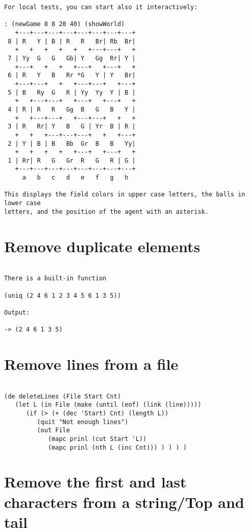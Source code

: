 \begin{verbatim}
For local tests, you can start also it interactively:

: (newGame 8 8 20 40) (showWorld)
   +---+---+---+---+---+---+---+---+
 8 | R   Y | B | R   R   Br| Rb  Br|
   +   +   +   +   +   +---+---+   +
 7 | Yy  G   G   Gb| Y   Gg  Rr| Y |
   +---+   +   +   +---+   +---+   +
 6 | R   Y   B   Rr *G   Y | Y   Br|
   +---+---+   +   +---+---+   +---+
 5 | B   Ry  G   R | Yy  Yy  Y | B |
   +   +---+---+   +---+   +---+   +
 4 | R | R   R   Gg  B   G   B   Y |
   +   +---+---+   +---+---+   +   +
 3 | R   Rr| Y   B   G | Yr  B | R |
   +   +   +---+---+---+   +   +---+
 2 | Y | B | B   Bb  Gr  B   B   Yy|
   +   +   +   +   +---+   +---+   +
 1 | Rr| R   G   Gr  R   G   R | G |
   +---+---+---+---+---+---+---+---+
     a   b   c   d   e   f   g   h

This displays the field colors in upper case letters, the balls in lower case
letters, and the position of the agent with an asterisk.

\end{verbatim}

\section*{Remove duplicate elements}

\begin{verbatim}

There is a built-in function

(uniq (2 4 6 1 2 3 4 5 6 1 3 5))

Output:

-> (2 4 6 1 3 5)

\end{verbatim}

\section*{Remove lines from a file}

\begin{verbatim}

(de deleteLines (File Start Cnt)
   (let L (in File (make (until (eof) (link (line)))))
      (if (> (+ (dec 'Start) Cnt) (length L))
         (quit "Not enough lines")
         (out File
            (mapc prinl (cut Start 'L))
            (mapc prinl (nth L (inc Cnt))) ) ) ) )

\end{verbatim}

\section*{Remove the first and last characters from a string/Top and tail}

